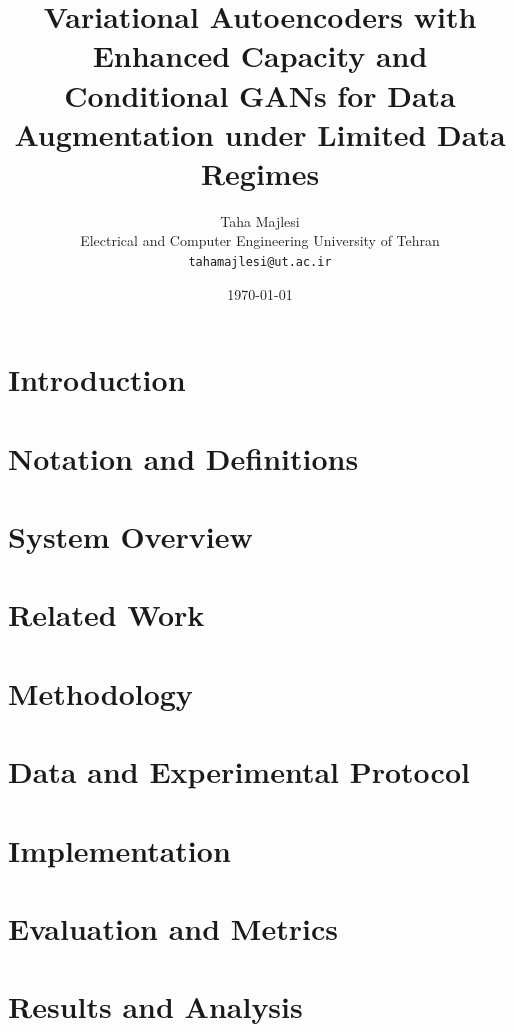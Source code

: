 \documentclass[11pt]{article}
\title{\textbf{Variational Autoencoders with Enhanced Capacity and Conditional GANs for Data Augmentation under Limited Data Regimes}}
\author{Taha Majlesi \\ Electrical and Computer Engineering University of Tehran \\ \texttt{tahamajlesi@ut.ac.ir}}
\date{\today}
\begin{document}
\maketitle

\begin{abstract}

\end{abstract}

\clearpage
\tableofcontents
\clearpage

\section{Introduction}


\section{Notation and Definitions}


\section{System Overview}


\section{Related Work}


\section{Methodology}


\section{Data and Experimental Protocol}




\section{Implementation}


\section{Evaluation and Metrics}


\section{Results and Analysis}

\end{document}
